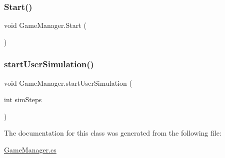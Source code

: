 \mbox{\label{class_game_manager_a5ccfacd027ad08eeb4ff1f25a7f59c98}} 
\subsubsection{\texorpdfstring{Start()}{Start()}}
{\footnotesize\ttfamily void Game\+Manager.\+Start (\begin{DoxyParamCaption}{ }\end{DoxyParamCaption})}

\mbox{\label{class_game_manager_ae6f288a4230d1cf2e5ed42614fcfc12a}} 
\subsubsection{\texorpdfstring{start\+User\+Simulation()}{startUserSimulation()}}
{\footnotesize\ttfamily void Game\+Manager.\+start\+User\+Simulation (\begin{DoxyParamCaption}\item[{int}]{sim\+Steps }\end{DoxyParamCaption})}



The documentation for this class was generated from the following file\+:\begin{DoxyCompactItemize}
\item 
\mbox{\hyperlink{_game_manager_8cs}{Game\+Manager.\+cs}}\end{DoxyCompactItemize}

